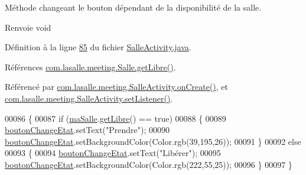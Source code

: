 Méthode changeant le bouton dépendant de la disponibilité de la salle. 

\begin{DoxyReturn}{Renvoie}
void 
\end{DoxyReturn}


Définition à la ligne \hyperlink{_salle_activity_8java_source_l00085}{85} du fichier \hyperlink{_salle_activity_8java_source}{Salle\+Activity.\+java}.



Références \hyperlink{_salle_8java_source_l00174}{com.\+lasalle.\+meeting.\+Salle.\+get\+Libre()}.



Référencé par \hyperlink{_salle_activity_8java_source_l00060}{com.\+lasalle.\+meeting.\+Salle\+Activity.\+on\+Create()}, et \hyperlink{_salle_activity_8java_source_l00132}{com.\+lasalle.\+meeting.\+Salle\+Activity.\+set\+Listener()}.


\begin{DoxyCode}
00086     \{
00087         \textcolor{keywordflow}{if} (\hyperlink{classcom_1_1lasalle_1_1meeting_1_1_salle_activity_a7ae6e92ee66fa15d999f166f40738648}{maSalle}.\hyperlink{classcom_1_1lasalle_1_1meeting_1_1_salle_adc0c4936355bc0ae22991f69c12a5e42}{getLibre}() == \textcolor{keyword}{true})
00088         \{
00089             \hyperlink{classcom_1_1lasalle_1_1meeting_1_1_salle_activity_a0c33eac55429431e84849eca22ad3916}{boutonChangeEtat}.setText(\textcolor{stringliteral}{"Prendre"});
00090             \hyperlink{classcom_1_1lasalle_1_1meeting_1_1_salle_activity_a0c33eac55429431e84849eca22ad3916}{boutonChangeEtat}.setBackgroundColor(Color.rgb(39,195,26));
00091         \}
00092         \textcolor{keywordflow}{else}
00093         \{
00094             \hyperlink{classcom_1_1lasalle_1_1meeting_1_1_salle_activity_a0c33eac55429431e84849eca22ad3916}{boutonChangeEtat}.setText(\textcolor{stringliteral}{"Libérer"});
00095             \hyperlink{classcom_1_1lasalle_1_1meeting_1_1_salle_activity_a0c33eac55429431e84849eca22ad3916}{boutonChangeEtat}.setBackgroundColor(Color.rgb(222,55,25));
00096         \}
00097     \}
\end{DoxyCode}
\mbox{\label{classcom_1_1lasalle_1_1meeting_1_1_salle_activity_a6d9b28a6a25b91ea9632ec4105dd33cf}} 

